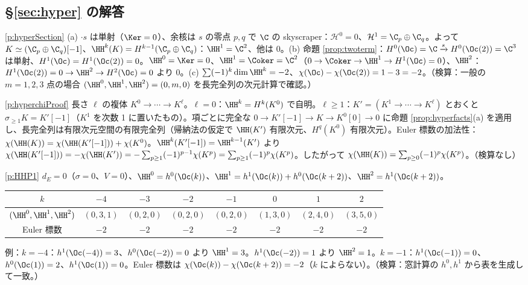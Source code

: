 \subsection*{§\ref{sec:hyper} の解答}
\begin{sol}{\ref{p:hyperSection}}
(a) $\cdot s$ は単射（$\Ker=0$）、余核は $s$ の零点 $p,q$ で $\C$ の skyscraper：$\mathcal H^0=0$、$\mathcal H^1=\C_p\oplus\C_q$。よって $K\simeq(\C_p\oplus\C_q)[-1]$、$\HH^k(K)=H^{k-1}(\C_p\oplus\C_q)$：$\HH^1=\C^2$、他は $0$。(b) 命題 \ref{prop:twoterm}：$H^0(\Oc)=\C\xrightarrow{s}H^0(\Oc(2))=\C^3$ は単射、$H^1(\Oc)=H^1(\Oc(2))=0$。$\HH^0=\Ker=0$、$\HH^1=\Coker=\C^2$（$0\to\Coker\to\HH^1\to H^1(\Oc)=0$）、$\HH^2$：$H^1(\Oc(2))=0\to\HH^2\to H^2(\Oc)=0$ より $0$。(c) $\sum(-1)^k\dim\HH^k=-2$、$\chi(\Oc)-\chi(\Oc(2))=1-3=-2$。（検算：一般の $m=1,2,3$ 点の場合 $(\HH^0,\HH^1,\HH^2)=(0,m,0)$ を長完全列の次元計算で確認。）
\end{sol}
\begin{sol}{\ref{p:hyperchiProof}}
長さ $\ell$ の複体 $K^0\to\cdots\to K^\ell$。$\ell=0$：$\HH^k=H^k(K^0)$ で自明。$\ell\ge1$：$K'=(K^1\to\cdots\to K^\ell)$ とおくと $\sigma_{\ge1}K=K'[-1]$（$K^1$ を次数 1 に置いたもの）。項ごとに完全な $0\to K'[-1]\to K\to K^0[0]\to0$ に命題 \ref{prop:hyperfacts}(a) を適用し、長完全列は有限次元空間の有限完全列（帰納法の仮定で $\HH(K')$ 有限次元、$H^q(K^0)$ 有限次元）。Euler 標数の加法性：$\chi(\HH(K))=\chi(\HH(K'[-1]))+\chi(K^0)$。$\HH^k(K'[-1])=\HH^{k-1}(K')$ より $\chi(\HH(K'[-1]))=-\chi(\HH(K'))=-\sum_{p\ge1}(-1)^{p-1}\chi(K^p)=\sum_{p\ge1}(-1)^p\chi(K^p)$。したがって $\chi(\HH(K))=\sum_{p\ge0}(-1)^p\chi(K^p)$。（検算なし）
\end{sol}
\begin{sol}{\ref{p:HHP1}}
$d_E=0$（$\sigma=0$、$V=0$）、$\HH^0=h^0(\Oc(k))$、$\HH^1=h^1(\Oc(k))+h^0(\Oc(k+2))$、$\HH^2=h^1(\Oc(k+2))$。
\begin{center}
\begin{tabular}{c|ccccccc}
\toprule
$k$ & $-4$ & $-3$ & $-2$ & $-1$ & $0$ & $1$ & $2$\\
\midrule
$(\HH^0,\HH^1,\HH^2)$ & $(0,3,1)$ & $(0,2,0)$ & $(0,2,0)$ & $(0,2,0)$ & $(1,3,0)$ & $(2,4,0)$ & $(3,5,0)$\\
Euler 標数 & $-2$ & $-2$ & $-2$ & $-2$ & $-2$ & $-2$ & $-2$\\
\bottomrule
\end{tabular}
\end{center}
例：$k=-4$：$h^1(\Oc(-4))=3$、$h^0(\Oc(-2))=0$ より $\HH^1=3$。$h^1(\Oc(-2))=1$ より $\HH^2=1$。$k=-1$：$h^1(\Oc(-1))=0$、$h^0(\Oc(1))=2$、$h^1(\Oc(1))=0$。Euler 標数は $\chi(\Oc(k))-\chi(\Oc(k+2))=-2$（$k$ によらない）。（検算：窓計算の $h^0,h^1$ から表を生成して一致。）
\end{sol}
